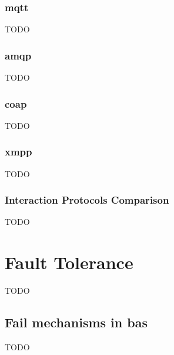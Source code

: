 \subsubsection{\acf{mqtt}}
TODO
\subsubsection{\acf{amqp}}
TODO
\subsubsection{\acf{coap}}
TODO
\subsubsection{\acf{xmpp}}
TODO
\subsubsection{Interaction Protocols Comparison}
TODO

\section{Fault Tolerance}
TODO

\subsection{Fail mechanisms in \ac{bas} }
TODO



